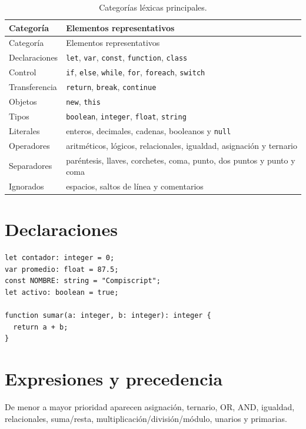 \documentclass[11pt,letterpaper,oneside]{report}
\newcommand{\codigo}[1]{\texttt{#1}}
\begin{document}
\begin{longtable}{p{}p{}}
\caption{Categorías léxicas principales.}\label{tab:lexico}\\
\toprule
Categoría & Elementos representativos \\
\midrule
\endfirsthead
\toprule
Categoría & Elementos representativos \\
\midrule
\endhead
Declaraciones & \codigo{let}, \codigo{var}, \codigo{const}, \codigo{function}, \codigo{class} \\
Control & \codigo{if}, \codigo{else}, \codigo{while}, \codigo{for}, \codigo{foreach}, \codigo{switch} \\
Transferencia & \codigo{return}, \codigo{break}, \codigo{continue} \\
Objetos & \codigo{new}, \codigo{this} \\
Tipos & \codigo{boolean}, \codigo{integer}, \codigo{float}, \codigo{string} \\
Literales & enteros, decimales, cadenas, booleanos y \codigo{null} \\
Operadores & aritméticos, lógicos, relacionales, igualdad, asignación y ternario \\
Separadores & paréntesis, llaves, corchetes, coma, punto, dos puntos y punto y coma \\
Ignorados & espacios, saltos de línea y comentarios \\
\bottomrule
\end{longtable}

\section{Declaraciones}

\begin{verbatim}
let contador: integer = 0;
var promedio: float = 87.5;
const NOMBRE: string = "Compiscript";
let activo: boolean = true;

function sumar(a: integer, b: integer): integer {
  return a + b;
}
\end{verbatim}

\section{Expresiones y precedencia}

De menor a mayor prioridad aparecen asignación, ternario, OR, AND, igualdad,
relacionales, suma/resta, multiplicación/división/módulo, unarios y primarias.
\end{document}
